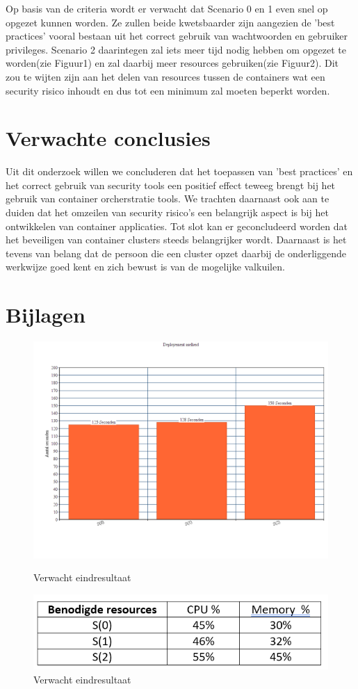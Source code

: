 Op basis van de criteria wordt er verwacht dat Scenario 0 en 1 even snel op opgezet kunnen worden. Ze zullen beide kwetsbaarder zijn aangezien de 'best practices' vooral bestaan uit het correct gebruik van wachtwoorden en gebruiker privileges.
Scenario 2 daarintegen zal iets meer tijd nodig hebben om opgezet te worden(zie Figuur1) en zal daarbij meer resources gebruiken(zie Figuur2). Dit zou te wijten zijn aan het delen van resources tussen de containers wat een security risico inhoudt en dus tot een minimum zal moeten beperkt worden\autocite{Education2019}.

\section{Verwachte conclusies}
\label{sec:verwachte_conclusies}

Uit dit onderzoek willen we concluderen dat het toepassen van 'best practices' en het correct gebruik van security tools een positief effect teweeg brengt bij het gebruik van container orcherstratie tools.
We trachten daarnaast ook aan te duiden dat het omzeilen van security risico's een belangrijk aspect is bij het ontwikkelen van container applicaties. 
Tot slot kan er geconcludeerd worden dat het beveiligen van container clusters steeds belangrijker wordt. Daarnaast is het tevens van belang dat de persoon die een cluster opzet daarbij de onderliggende werkwijze goed kent en zich bewust is van de mogelijke valkuilen.

\section{Bijlagen}
\label{sec:Bijlagen}
\begin{figure}[ht]
	\includegraphics[width=\linewidth]{img/Mock1.png}
	\caption{Verwacht eindresultaat}
	\label{fig:example}
	\includegraphics[width=\linewidth]{img/Mock2.png}
	\caption{Verwacht eindresultaat}
  \label{fig:example}
\end{figure}